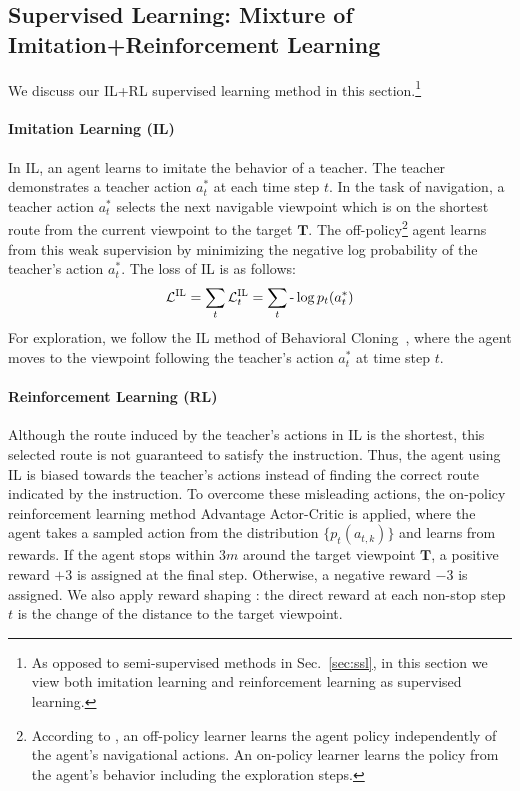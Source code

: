 \documentclass[11pt,a4paper]{article}
\begin{document}
\subsection{Supervised Learning: Mixture of Imitation+Reinforcement Learning}
\label{sec:rl}
We discuss our IL+RL supervised learning method in this section.\footnote{As opposed to semi-supervised methods in Sec.~\ref{sec:ssl}, in this section we view both imitation learning and reinforcement learning as supervised learning.}

\paragraph{Imitation Learning (IL)}
In IL, an agent learns to imitate the behavior of a teacher. 
The teacher demonstrates a teacher action $a^*_t$ at each time step $t$.
In the task of navigation, a teacher action $a^*_t$ selects the next navigable viewpoint which is on the shortest route from the current viewpoint to the target $\mathbf{T}$.
The off-policy\footnote{According to , an off-policy learner learns the agent policy independently of the agent's navigational actions. An on-policy learner learns the policy from the agent's behavior including the exploration steps.} agent learns from this weak supervision by minimizing the negative log probability of the teacher's action $a^*_t$. 
The loss of IL is as follows:
\begin{equation}
\mathcal{L}^\textsc{IL} = \sum_t \mathcal{L}^\textsc{IL}_t =  \sum_t \mbox{-} \log p_t(a^*_t) 
\end{equation}
For exploration, we follow the IL method of Behavioral Cloning~\cite{bojarski2016end}, where the agent moves to the viewpoint following the teacher's action $a^*_t$ at time step $t$.

\paragraph{Reinforcement Learning (RL)}
Although the route induced by the teacher's actions in IL is the shortest, this selected route is not guaranteed to satisfy the instruction. 
Thus, the agent using IL is biased towards the teacher's actions instead of finding the correct route indicated by the instruction. 
To overcome these misleading actions, the on-policy reinforcement learning method Advantage Actor-Critic \cite{mnih2016asynchronous} is applied,
where the agent takes a sampled action from the distribution $\{p_t(a_{t,k})\}$ and learns from rewards. 
If the agent stops within $3m$ around the target viewpoint $\mathbf T$, a positive reward $+3$ is assigned at the final step. 
Otherwise, a negative reward $-3$ is assigned.
We also apply reward shaping \cite{wu2018building}: the direct reward at each non-stop step $t$ is the change of the distance to the target viewpoint. 
\end{document}

